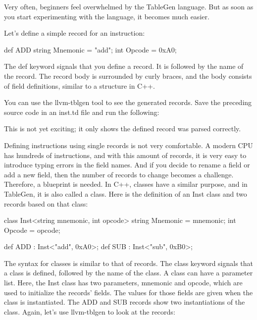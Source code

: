
Very often, beginners feel overwhelmed by the TableGen language. But as soon as you start experimenting with the language, it becomes much easier.


Let’s define a simple record for an instruction:

\begin{shell}
def ADD {
    string Mnemonic = "add";
    int Opcode = 0xA0;
}
\end{shell}

The def keyword signals that you define a record. It is followed by the name of the record. The record body is surrounded by curly braces, and the body consists of field definitions, similar to a structure in C++.

You can use the llvm-tblgen tool to see the generated records. Save the preceding source code in an inst.td file and run the following:


This is not yet exciting; it only shows the defined record was parsed correctly.

Defining instructions using single records is not very comfortable. A modern CPU has hundreds of instructions, and with this amount of records, it is very easy to introduce typing errors in the field names. And if you decide to rename a field or add a new field, then the number of records to change becomes a challenge. Therefore, a blueprint is needed. In C++, classes have a similar purpose, and in TableGen, it is also called a class. Here is the definition of an Inst class and two records based on that class:

\begin{shell}
class Inst<string mnemonic, int opcode> {
    string Mnemonic = mnemonic;
    int Opcode = opcode;
}

def ADD : Inst<"add", 0xA0>;
def SUB : Inst<"sub", 0xB0>;
\end{shell}

The syntax for classes is similar to that of records. The class keyword signals that a class is defined, followed by the name of the class. A class can have a parameter list. Here, the Inst class has two parameters, mnemonic and opcode, which are used to initialize the records’ fields. The values for those fields are given when the class is instantiated. The ADD and SUB records show two instantiations of the class. Again, let’s use llvm-tblgen to look at the records:

